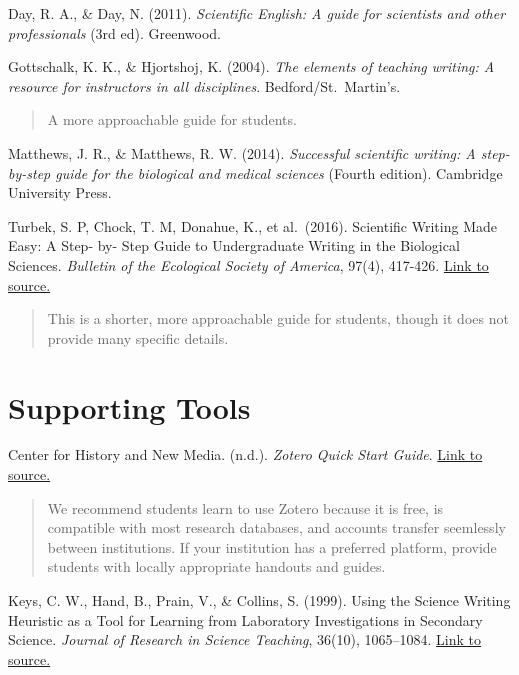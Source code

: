 \documentclass[
]{book}
\begin{document}
Day, R. A., \& Day, N. (2011). \emph{Scientific English: A guide for scientists and other professionals} (3rd ed). Greenwood.

Gottschalk, K. K., \& Hjortshoj, K. (2004). \emph{The elements of teaching writing: A resource for instructors in all disciplines}. Bedford/St.~Martin's.

\begin{quote}
A more approachable guide for students.
\end{quote}

Matthews, J. R., \& Matthews, R. W. (2014). \emph{Successful scientific writing: A step-by-step guide for the biological and medical sciences} (Fourth edition). Cambridge University Press.

Turbek, S. P, Chock, T. M, Donahue, K., et al.~(2016). Scientific Writing Made Easy: A Step- by- Step Guide to Undergraduate Writing in the Biological Sciences. \emph{Bulletin of the Ecological Society of America}, 97(4), 417-426. \href{https://doi.org/10.1002/bes2.1258}{Link to source.}

\begin{quote}
This is a shorter, more approachable guide for students, though it does not provide many specific details.
\end{quote}

\hypertarget{supporting-tools}{%
\section{Supporting Tools}\label{supporting-tools}}

Center for History and New Media. (n.d.). \emph{Zotero Quick Start Guide}. \href{http://zotero.org/support/quick_start_guide}{Link to source.}

\begin{quote}
We recommend students learn to use Zotero because it is free, is compatible with most research databases, and accounts transfer seemlessly between institutions. If your institution has a preferred platform, provide students with locally appropriate handouts and guides.
\end{quote}

Keys, C. W., Hand, B., Prain, V., \& Collins, S. (1999). Using the Science Writing Heuristic as a Tool for Learning from Laboratory Investigations in Secondary Science. \emph{Journal of Research in Science Teaching}, 36(10), 1065--1084. \href{http://DOI:10.1002/(SICI)1098-2736(199912)36:10\%3C1065::AID-TEA2\%3E3.0.CO;2-I}{Link to source.}
\end{document}
